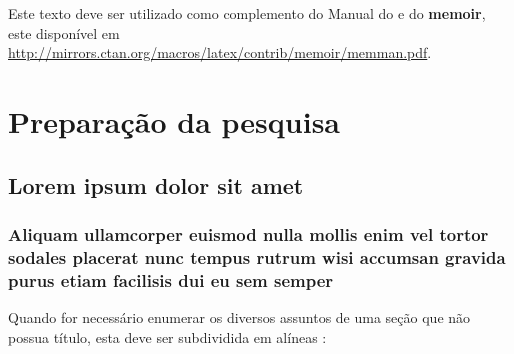 \documentclass[12pt,openright,twoside,a4paper]{abntex2}
\begin{document}
Este texto deve ser utilizado como complemento do Manual do \abnTeX e do
\textbf{memoir}, este disponível em
\url{http://mirrors.ctan.org/macros/latex/contrib/memoir/memman.pdf}.


\part{Preparação da pesquisa}

\chapter{Lorem ipsum dolor sit amet}


\section{Aliquam ullamcorper euismod nulla mollis enim vel tortor sodales placerat nunc
tempus rutrum wisi accumsan gravida purus etiam facilisis dui eu sem semper}

Quando for necessário enumerar os diversos assuntos de uma seção que não possua
título, esta deve ser subdividida em alíneas \cite[4.2]{NBR6024:2012}:
\end{document}
